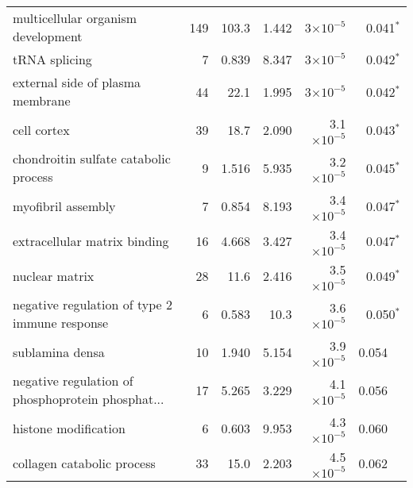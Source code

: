 \begin{longtable}{|l|r|r|r|r|r|}
                multicellular organism development &                     149 &                   103.3 &      1.442 &    3$\times 10^{-5}$ &                 0.041$\bm{^*}$ \\
                                     tRNA splicing &                       7 &                   0.839 &      8.347 &    3$\times 10^{-5}$ &                 0.042$\bm{^*}$ \\
                  external side of plasma membrane &                      44 &                    22.1 &      1.995 &    3$\times 10^{-5}$ &                 0.042$\bm{^*}$ \\
                                       cell cortex &                      39 &                    18.7 &      2.090 &  3.1$\times 10^{-5}$ &                 0.043$\bm{^*}$ \\
             chondroitin sulfate catabolic process &                       9 &                   1.516 &      5.935 &  3.2$\times 10^{-5}$ &                 0.045$\bm{^*}$ \\
                                myofibril assembly &                       7 &                   0.854 &      8.193 &  3.4$\times 10^{-5}$ &                 0.047$\bm{^*}$ \\
                      extracellular matrix binding &                      16 &                   4.668 &      3.427 &  3.4$\times 10^{-5}$ &                 0.047$\bm{^*}$ \\
                                    nuclear matrix &                      28 &                    11.6 &      2.416 &  3.5$\times 10^{-5}$ &                 0.049$\bm{^*}$ \\
     negative regulation of type 2 immune response &                       6 &                   0.583 &       10.3 &  3.6$\times 10^{-5}$ &                 0.050$\bm{^*}$ \\
                                   sublamina densa &                      10 &                   1.940 &      5.154 &  3.9$\times 10^{-5}$ &                        0.054~~ \\
 negative regulation of phosphoprotein phosphat... &                      17 &                   5.265 &      3.229 &  4.1$\times 10^{-5}$ &                        0.056~~ \\
                              histone modification &                       6 &                   0.603 &      9.953 &  4.3$\times 10^{-5}$ &                        0.060~~ \\
                        collagen catabolic process &                      33 &                    15.0 &      2.203 &  4.5$\times 10^{-5}$ &                        0.062~~ \\

\end{longtable}
